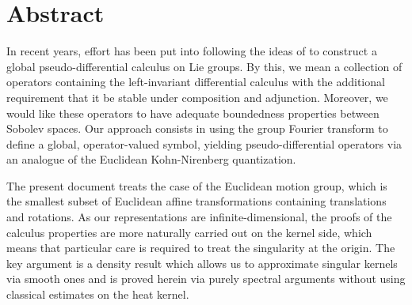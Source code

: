 \chapter*{Abstract}

In recent years,
effort has been put into following the ideas of \citeauthor{RuzhanskyTurunen10}
to construct a global pseudo-differential calculus on Lie groups.
By this, we mean a collection of operators containing the left-invariant differential calculus
with the additional requirement that it be stable under composition and adjunction.
Moreover,
we would like these operators to
have adequate boundedness properties between Sobolev spaces.
Our approach consists in using the group Fourier transform to define a global, operator-valued symbol,
yielding pseudo-differential operators via an analogue of the Euclidean Kohn-Nirenberg quantization.

The present document treats the case of the Euclidean motion group,
which is the smallest subset of Euclidean affine transformations containing translations and rotations.
As our representations are infinite-dimensional,
the proofs of the calculus properties are more naturally carried out on the kernel side,
which means that particular care is required to treat the singularity at the origin.
The key argument is a density result which allows us to approximate singular kernels via smooth ones
and is proved herein via purely spectral arguments without using classical estimates on the heat kernel.
